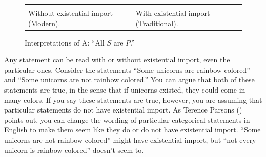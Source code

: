 \begin{figure}
\begin{mdframed}[style=mytablebox]
\begin{tabu}{X[1,c,m]X[1,c,m]} 


&


\\

Without existential import 
(Modern).

&

With existential import 
(Traditional).  

\end{tabu}
\end{mdframed}
\caption{Interpretations of A: ``All $S$ are $P$.''}
\label{fig:existential_import}
\end{figure}

Any statement can be read with or without existential import, even the particular ones. Consider the statements ``Some unicorns are rainbow colored'' and ``Some unicorns are not rainbow colored.'' You can argue that both of these statements are true, in the sense that if unicorns existed, they could come in many colors. If you say these statements are true, however, you are assuming that particular statements do not have existential import. As Terence Parsons (\citeyear{Parsons1997}) points out, you can change the wording of particular categorical statements in English to make them seem like they do or do not have existential import. ``Some unicorns are not rainbow colored'' might have existential import, but ``not every unicorn is rainbow colored'' doesn't seem to.	

